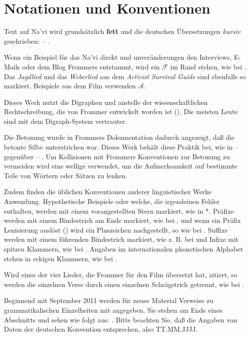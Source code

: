 \section{Notationen und Konventionen}

Text auf Na’vi wird grunds\"atzlich \textbf{fett} und die deutschen \"Ubersetzungen
\textit{kursiv} geschrieben:  -- .

Wenn ein Beispiel f\"ur das Na’vi direkt und unver\"anderungen den Interviews,
E-Mails oder dem Blog Frommers entstammt, wird ein $\mathcal{F}$ im Rand stehen,
wie bei . Das \textit{Jagdlied} und das \textit{Weberlied} aus
dem \textit{Activist Survival Guide} sind ebenfalls so markiert. Beispiele aus
dem Film verwenden $\mathcal{A}$.

Dieses Werk nutzt die Digraphen  und  anstelle der wissenschaftlichen
Rechtschreibung, die von Frommer entwickelt worden ist ().
Die meisten Leute sind mit dem Digraph-System vertrauter.

Die Betonung wurde in Frommers Dokumentation dadurch angezeigt, da\ss{} die betonte
Silbe unterstrichen war. Dieses Werk beh\"alt diese Praktik bei, wie in
 --  gegen\"uber  -- .
Um Kollisionen mit Frommers Konventionen zur Betonung zu vermeiden wird eine
wellige  verwendet, um die Aufmerksamkeit auf bestimmte
Teile von W\"ortern oder S\"atzen zu lenken.

Zudem finden die \"ublichen Konventionen anderer linguistischer Werke Anwendung.
Hypothetische Beispiele oder welche, die irgendeinen Fehler enthalten, werden
mit einem vorangestellten Stern markiert, wie in *. Pr\"afixe werden
mit einem Bindestrich am Ende markiert, wie bei , und wenn ein Pr\"afix
Lenisierung ausl\"ost () wird ein Pluszeichen
nachgestellt, so wie bei . Suffixe werden mit einem f\"uhrenden Bindestrich
markiert, wie z. B. bei  und Infixe mit spitzen Klammern, wie bei
. Angaben im internationalen phonetischen Alphabet stehen in eckigen
Klammern, wie bei {\gplus [fɪ.ˈfja]}.

Wird eines der vier Lieder, die Frommer f\"ur den Film \"ubersetzt hat, zitiert,
so werden die einzelnen Verse durch einen einzelnen Schr\"agstrich getrennt, wie
bei .

Beginnend mit September 2011 werden f\"ur neues Material Verweise zu
grammatikalischen Einzelheiten mit angegeben. Sie stehen am Ende eines Abschnitts
und sehen wie folgt aus:
.
Bitte beachten Sie, da\ss{} die Angaben von Daten der deutschen Konvention
entsprechen, also TT.MM.JJJJ.

